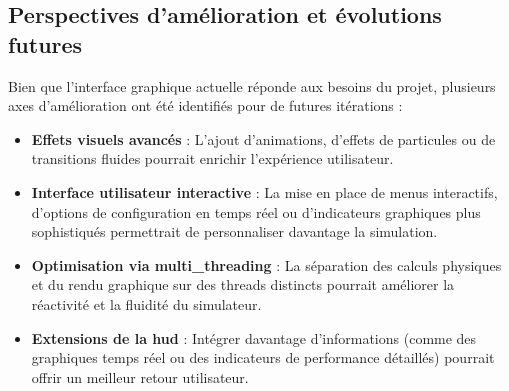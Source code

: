 \subsection{Perspectives d'amélioration et évolutions futures}\label{subsec:perspectives-d-evolution}
Bien que l'interface graphique actuelle réponde aux besoins du projet, plusieurs axes d'amélioration ont été identifiés pour de futures itérations :
\begin{itemize}
    \item \textbf{Effets visuels avancés} : L'ajout d'animations, d'effets de particules ou de transitions fluides pourrait enrichir l'expérience utilisateur.
    \item \textbf{Interface utilisateur interactive} : La mise en place de menus interactifs, d'options de configuration en temps réel ou d'indicateurs graphiques plus sophistiqués permettrait de personnaliser davantage la simulation.
    \item \textbf{Optimisation via \gls{multi_threading}} : La séparation des calculs physiques et du rendu graphique sur des threads distincts pourrait améliorer la réactivité et la fluidité du simulateur.
    \item \textbf{Extensions de la \gls{hud} } : Intégrer davantage d'informations (comme des graphiques temps réel ou des indicateurs de performance détaillés) pourrait offrir un meilleur retour utilisateur.
\end{itemize}
